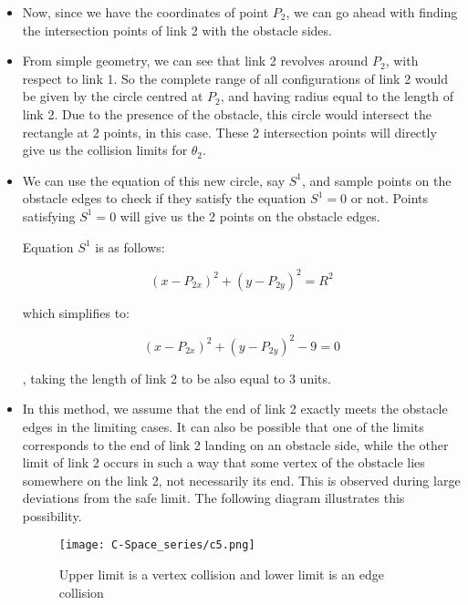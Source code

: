\documentclass[12pt]{article}
\begin{document}
\begin{itemize}
    \item Now, since we have the coordinates of point \(P_2\), we can go ahead with finding the intersection points of link 2 with the obstacle sides.
    
    \item From simple geometry, we can see that link 2 revolves around \(P_2\), with respect to link 1. So the complete range of all configurations of link 2 would be given by the circle centred at \(P_2\), and having radius equal to the length of link 2. Due to the presence of the obstacle, this circle would intersect the rectangle at 2 points, in this case. These 2 intersection points will directly give us the collision limits for \(\theta_2\).
    
    \item We can use the equation of this new circle, say \(S^1\), and sample points on the obstacle edges to check if they satisfy the equation \(S^1 = 0\) or not. Points satisfying \(S^1 = 0\) will give us the 2 points on the obstacle edges.

Equation \(S^1\) is as follows:

\[
(x - P_{2x})^2 + (y - P_{2y})^2 = R^2
\]

\clearpage
which simplifies to:

\[
(x - P_{2x})^2 + (y - P_{2y})^2 - 9 = 0
\]

, taking the length of link 2 to be also equal to 3 units.
    \item In this method, we assume that the end of link 2 exactly meets the obstacle edges in the limiting cases. It can also be possible that one of the limits corresponds to the end of link 2 landing on an obstacle side, while the other limit of link 2 occurs in such a way that some vertex of the obstacle lies somewhere on the link 2, not necessarily its end. This is observed during large deviations from the safe limit.  The following diagram illustrates this possibility.
    \begin{figure}[h!]
    \centering
    \begin{minipage}{0.8\textwidth}
        \centering
        \texttt{[image: C-Space\_series/c5.png]}
        \caption{Upper limit is a vertex collision and lower limit is an edge collision}
        \label{fig:c5}
    \end{minipage}
    \hfill
    

\end{figure}
\end{itemize}
\end{document}
